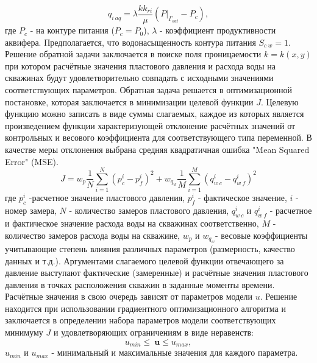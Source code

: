 \documentclass{article}
\begin{document}
\begin{equation} \label{qaq}
q_{i\:aq} = \lambda \frac{kk_{ri}}{\mu}(P|_{\Gamma_{out}}-P_c),
\end{equation}
где $P_{c}$ - на контуре питания ($P_c = P_0$), $\lambda$ - коэффициент продуктивности аквифера. Предполагается, что водонасыщенность контура питания $S_{c\:w} = 1$.
Решение обратной задачи заключается в поиске поля проницаемости $k = k(x,y)$ при котором расчётные значения пластового давления и расхода воды на скважинах будут удовлетворительно совпадать с исходными значениями соответствующих параметров. Обратная задача решается в оптимизационной постановке, которая заключается в минимизации целевой функции $J$. Целевую функцию можно записать в виде суммы слагаемых, каждое из которых является произведением функции характеризующей отклонение расчётных значений от контрольных и весового коэффициента для соответствующего типа переменной. В качестве меры отклонения выбрана средняя квадратичная ошибка "Mean Squared Error" (MSE). 
\begin{equation} \label{mape}
	J=w_p\frac{1}{N}\sum_{i=1}^N{\left(p_c^i-p_f^i\right)^2}+w_{q_w}\frac{1}{M}\sum_{i=1}^M{\left(q_{w\:c}^i-q_{w\:f}^i\right)^2}
\end{equation}
где $p_c^i$ -расчетное значение пластового давления, $p_f^i$ - фактическое значение, $i$ - номер замера, $N$ - количество замеров пластового давления, $q_{w\:c}^i$ и $q_{w\:f}^i$ - расчетное и фактическое значение расхода воды на скважинах соответственно, $M$ - количество замеров расхода воды на скважине, $w_p$ и $w_{q_w}$- весовые коэффициенты учитывающие степень влияния различных параметров (размерность, качество данных и т.д.). Аргументами слагаемого целевой функции отвечающего за давление выступают фактические (замеренные) и расчётные значения пластового давления в точках расположения скважин в заданные моменты времени.  
 Расчётные значения в свою очередь зависят от параметров модели $u$. Решение находится при использовании градиентного оптимизационного алгоритма и заключается в определении набора параметров модели соответствующих минимуму $J$ и удовлетворяющих ограничениям в виде неравенств:
\begin{equation*}
u_{min}\leq\ \boldsymbol{u}\leq u_{max},
\end{equation*}
$u_{min}$ и $u_{max}$ - минимальный и максимальные значения для каждого параметра.
\end{document}
